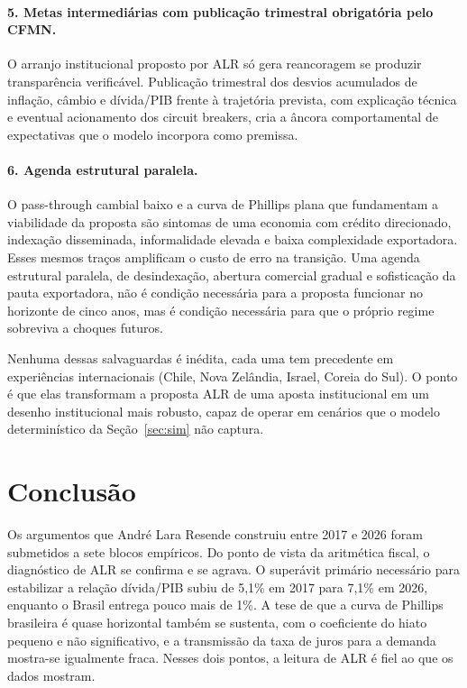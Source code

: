 \documentclass[11pt,a4paper]{article}
\begin{document}
\paragraph{5. Metas intermediárias com publicação trimestral obrigatória
pelo CFMN.} O arranjo institucional proposto por ALR só gera reancoragem
se produzir transparência verificável. Publicação trimestral dos desvios
acumulados de inflação, câmbio e dívida/PIB frente à trajetória prevista,
com explicação técnica e eventual acionamento dos circuit breakers, cria
a âncora comportamental de expectativas que o modelo incorpora como premissa.

\paragraph{6. Agenda estrutural paralela.} O pass-through cambial baixo
e a curva de Phillips plana que fundamentam a viabilidade da proposta
são sintomas de uma economia com crédito direcionado, indexação
disseminada, informalidade elevada e baixa complexidade exportadora.
Esses mesmos traços amplificam o custo de erro na transição. Uma agenda
estrutural paralela, de desindexação, abertura comercial gradual e
sofisticação da pauta exportadora, não é condição necessária para a
proposta funcionar no horizonte de cinco anos, mas é condição necessária
para que o próprio regime sobreviva a choques futuros.

Nenhuma dessas salvaguardas é inédita, cada uma tem precedente em
experiências internacionais (Chile, Nova Zelândia, Israel, Coreia do
Sul). O ponto é que elas transformam a proposta ALR de uma aposta
institucional em um desenho institucional mais robusto, capaz de operar
em cenários que o modelo determinístico da Seção~\ref{sec:sim} não captura.

\section{Conclusão}\label{sec:concl}

Os argumentos que André Lara Resende construiu entre 2017 e 2026 foram
submetidos a sete blocos empíricos. Do ponto de vista da aritmética
fiscal, o diagnóstico de ALR se confirma e se agrava. O superávit
primário necessário para estabilizar a relação dívida/PIB subiu de
5,1\% em 2017 para 7,1\% em 2026, enquanto o Brasil entrega pouco mais
de 1\%. A tese de que a curva de Phillips brasileira é quase horizontal
também se sustenta, com o coeficiente do hiato pequeno e não
significativo, e a transmissão da taxa de juros para a demanda
mostra-se igualmente fraca. Nesses dois pontos, a leitura de ALR é
fiel ao que os dados mostram.
\end{document}
